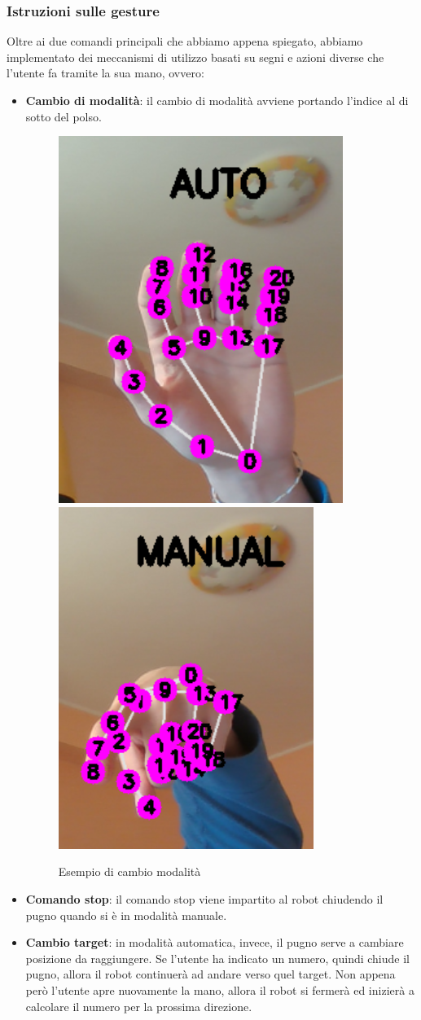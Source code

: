 \documentclass[]{article}
\begin{document}
\subsubsection{Istruzioni sulle gesture}
Oltre ai due comandi principali che abbiamo appena spiegato, abbiamo implementato dei meccanismi di utilizzo basati su segni e azioni diverse che l'utente fa tramite la sua mano, ovvero:
\begin{itemize}
    \item \textbf{Cambio di modalità}: il cambio di modalità avviene portando l'indice al di sotto del polso.
    \begin{figure}[H]
        \centering
        \includegraphics[height=0.4\linewidth]{immagini/mode_auto.png}
        \hspace*{5pt}
        \includegraphics[height=0.4\linewidth]{immagini/cambio_mode.png}
        \caption{Esempio di cambio modalità}
    \end{figure}
    \item \textbf{Comando stop}: il comando stop viene impartito al robot chiudendo il pugno quando si è in modalità manuale. 
    \item \textbf{Cambio target}: in modalità automatica, invece, il pugno serve a cambiare posizione da raggiungere. Se l'utente ha indicato un numero, quindi chiude il pugno, allora il robot continuerà ad andare verso quel target. Non appena però l'utente apre nuovamente la mano, allora il robot si fermerà ed inizierà a calcolare il numero per la prossima direzione.

\end{itemize}
\end{document}
